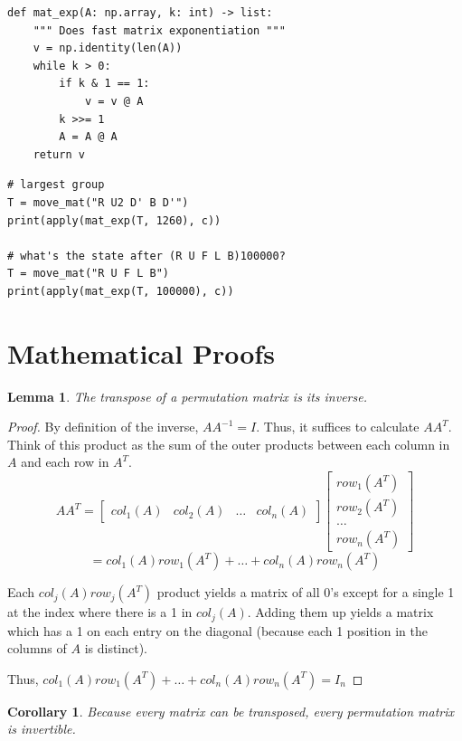 \documentclass[11pt, oneside]{article}
\theoremstyle{plain}
\newtheorem{corollary}{Corollary}[theorem]
\newtheorem{lemma}[theorem]{Lemma}
\begin{document}
\begin{verbatim}
def mat_exp(A: np.array, k: int) -> list:
    """ Does fast matrix exponentiation """
    v = np.identity(len(A))
    while k > 0:
        if k & 1 == 1:
            v = v @ A
        k >>= 1
        A = A @ A
    return v
\end{verbatim}

\begin{verbatim}
# largest group
T = move_mat("R U2 D' B D'")
print(apply(mat_exp(T, 1260), c))

# what's the state after (R U F L B)100000?
T = move_mat("R U F L B")
print(apply(mat_exp(T, 100000), c))
\end{verbatim}

\section{Mathematical Proofs}

\begin{lemma}
The transpose of a permutation matrix is its inverse.
\end{lemma}

\begin{proof}
By definition of the inverse, \( A A^{-1} = I \).
Thus, it suffices to calculate \( AA^T \).
Think of this product as the sum of the outer products between
each column in \( A \) and each row in \( A^T \).
\[ AA^T = \begin{bmatrix} col_1(A) & col_2(A) & \dots & col_n(A) \end{bmatrix}
\begin{bmatrix} row_1(A^T) \\ row_2(A^T) \\ \dots \\ row_n(A^T) \end{bmatrix} \]
\[ = col_1(A) row_1(A^T) + \dots + col_n(A) row_n(A^T) \]

Each \( col_j(A) row_j(A^T) \) product yields a matrix of all 0's except for
a single 1 at the index where there is a 1 in \( col_j(A) \). Adding them up
yields a matrix which has a 1 on each entry on the diagonal (because each 1
position in the columns of \( A \) is distinct).

Thus, \( col_1(A) row_1(A^T) + \dots + col_n(A) row_n(A^T) = I_n \)
\end{proof}

\begin{corollary}
Because every matrix can be transposed, every permutation matrix is invertible.
\end{corollary}
\end{document}
